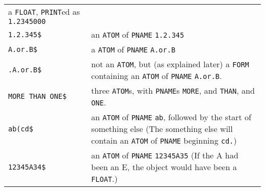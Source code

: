 \documentclass[a4paper]{scrbook}
\begin{document}
\begin{longtable}[]{@{}ll@{}}
\begin{minipage}[t]{0.67\columnwidth}
a \texttt{FLOAT}, \texttt{PRINT}ed as \texttt{1.2345000}\strut
\end{minipage}\tabularnewline
\begin{minipage}[t]{0.27\columnwidth}\raggedright\strut
\texttt{1.2.345\$}\strut
\end{minipage} & \begin{minipage}[t]{0.67\columnwidth}\raggedright\strut
an \texttt{ATOM} of \texttt{PNAME} \texttt{1.2.345}\strut
\end{minipage}\tabularnewline
\begin{minipage}[t]{0.27\columnwidth}\raggedright\strut
\texttt{A.or.B\$}\strut
\end{minipage} & \begin{minipage}[t]{0.67\columnwidth}\raggedright\strut
a \texttt{ATOM} of \texttt{PNAME} \texttt{A.or.B}\strut
\end{minipage}\tabularnewline
\begin{minipage}[t]{0.27\columnwidth}\raggedright\strut
\texttt{.A.or.B\$}\strut
\end{minipage} & \begin{minipage}[t]{0.67\columnwidth}\raggedright\strut
not an \texttt{ATOM}, but (as explained later) a \texttt{FORM} containing an \texttt{ATOM} of \texttt{PNAME}
\texttt{A.or.B}.\strut
\end{minipage}\tabularnewline
\begin{minipage}[t]{0.27\columnwidth}\raggedright\strut
\texttt{MORE\ THAN\ ONE\$}\strut
\end{minipage} & \begin{minipage}[t]{0.67\columnwidth}\raggedright\strut
three \texttt{ATOM}s, with \texttt{PNAME}s \texttt{MORE}, and \texttt{THAN}, and \texttt{ONE}.\strut
\end{minipage}\tabularnewline
\begin{minipage}[t]{0.27\columnwidth}\raggedright\strut
\texttt{ab(cd\$}\strut
\end{minipage} & \begin{minipage}[t]{0.67\columnwidth}\raggedright\strut
an \texttt{ATOM} of \texttt{PNAME} \texttt{ab}, followed by the start of something else (The something else will contain an
\texttt{ATOM} of \texttt{PNAME} beginning \texttt{cd.})\strut
\end{minipage}\tabularnewline
\begin{minipage}[t]{0.27\columnwidth}\raggedright\strut
\texttt{12345A34\$}\strut
\end{minipage} & \begin{minipage}[t]{0.67\columnwidth}\raggedright\strut
an \texttt{ATOM} of \texttt{PNAME} \texttt{12345A35} (If the A had been an E, the object would have been a
\texttt{FLOAT}.)\strut
\end{minipage}\tabularnewline
\bottomrule
\end{longtable}
\end{document}

